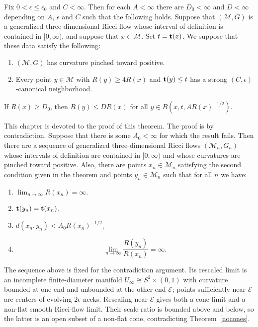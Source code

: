 \begin{theorem}
\label{thm:bounded-curvature-bounded-distance}
\label{bcbd}

Fix $0<\epsilon\le \epsilon_0$ and  $C<\infty$. Then for each
$A<\infty$ there are $D_0<\infty$ and $D<\infty$ depending on $A$,
$\epsilon$ and $C$ such that the following holds. Suppose that
$({\mathcal M},G)$ is a generalized three-dimensional Ricci flow
whose interval of definition is contained in $[0,\infty)$, and
suppose that $x\in {\mathcal M}$. Set $t={\bf t}(x)$. We suppose
that these data satisfy the following:
\begin{enumerate}
\item[(1)] $({\mathcal M},G)$ has curvature pinched toward positive.
\item[(2)] Every point $y\in{\mathcal  M}$ with
$R(y)\ge 4R(x)$  and ${\bf t}(y)\le t$ has a strong
$(C,\epsilon)$-canonical neighborhood.
\end{enumerate}
If $R(x)\ge D_0$, then $R(y)\le DR(x)$ for all $y\in
B(x,t,AR(x)^{-1/2})$.
\end{theorem}


This chapter is devoted to the proof of this theorem. The proof is
by contradiction. Suppose that there is some $A_0<\infty$ for which
the result fails. Then there are a sequence of generalized
three-dimensional Ricci flows $({\mathcal M}_n,G_n)$  whose
intervals of definition are contained in $[0,\infty)$ and whose
curvatures are pinched toward positive. Also, there are points
$x_n\in {\mathcal M}_n$ satisfying the second condition given in the
theorem and points $y_n\in {\mathcal M}_n$ such that for all $n$ we
have:
\begin{enumerate}
\item[(1)] $\lim_{n\rightarrow\infty}R(x_n)=\infty$.
\item[(2)] ${\bf t}(y_n)={\bf t}(x_n)$,
\item[(3)] $d(x_n,y_n)< A_0R(x_n)^{-1/2}$,
\item[(4)] $$\lim_{n\rightarrow\infty}\frac{R(y_n)}{R(x_n)}=\infty.$$
\end{enumerate}
The sequence above is fixed for the contradiction argument. Its
rescaled limit is an incomplete finite-diameter manifold
$U_\infty\cong S^2\times(0,1)$ with curvature bounded at one end and
unbounded at the other end ${\mathcal E}$; points sufficiently near
${\mathcal E}$ are centers of evolving $2\epsilon$-necks. Rescaling
near ${\mathcal E}$ gives both a cone limit and a non-flat smooth
Ricci-flow limit. Their scale ratio is bounded above and below, so
the latter is an open subset of a non-flat cone, contradicting
Theorem~\ref{nocones}.

